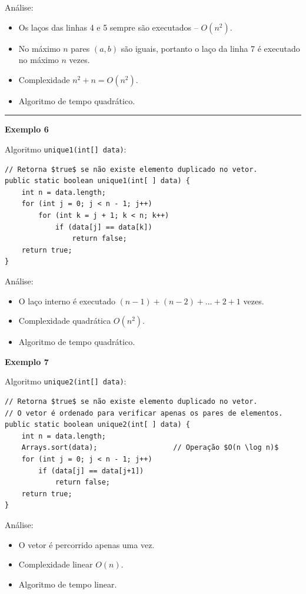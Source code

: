 Análise:
\begin{itemize}
	\item Os laços das linhas 4 e 5 sempre são executados -- $O(n^2)$.
	\item No máximo $n$ pares $(a, b)$ são iguais, portanto o laço da linha 7 é executado no máximo $n$ vezes.
	\item Complexidade $n^2 + n = O(n^2)$.
	\item Algoritmo de tempo quadrático.
\end{itemize}

\medskip

\rule{\textwidth}{1pt}

\textbf{Exemplo 6}

Algoritmo \texttt{unique1(int[] data)}:
\begin{verbatim}
// Retorna $true$ se não existe elemento duplicado no vetor.
public static boolean unique1(int[ ] data) {
	int n = data.length;
	for (int j = 0; j < n - 1; j++)
		for (int k = j + 1; k < n; k++)
			if (data[j] == data[k])
				return false;
	return true;
}
\end{verbatim}

Análise:
\begin{itemize}
	\item O laço interno é executado $(n - 1) + (n - 2) + \dots + 2 + 1$ vezes.
	\item Complexidade quadrática $O(n^2)$.
	\item Algoritmo de tempo quadrático.
\end{itemize}

\clearpage

\textbf{Exemplo 7}

Algoritmo \texttt{unique2(int[] data)}:
\begin{verbatim}
// Retorna $true$ se não existe elemento duplicado no vetor.
// O vetor é ordenado para verificar apenas os pares de elementos.
public static boolean unique2(int[ ] data) {
	int n = data.length;
	Arrays.sort(data);					// Operação $O(n \log n)$
	for (int j = 0; j < n - 1; j++)
		if (data[j] == data[j+1])
			return false;
	return true;
}
\end{verbatim}

Análise:
\begin{itemize}
	\item O vetor é percorrido apenas uma vez.
	\item Complexidade linear $O(n)$.
	\item Algoritmo de tempo linear.
\end{itemize}

